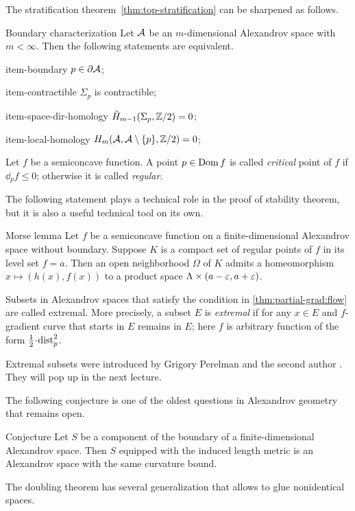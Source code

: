 The stratification theorem~\ref{thm:top-stratification} can be sharpened as follows.

\begin{thm}{Boundary characterization}
Let $\mathcal{A}$ be an $m$-dimensional Alexandrov space with $m<\infty$.
Then the following statements are equivalent.

\begin{subthm}{item-boundary} $p\in \partial \mathcal{A}$;
\end{subthm}

\begin{subthm}{item-contractible} $\Sigma_p$ is contractible;
\end{subthm}

\begin{subthm}{item-space-dir-homology} $\tilde H_{m-1}(\Sigma_p,\mathbb{Z}/2)= 0$;
\end{subthm}

\begin{subthm}{item-local-homology} $H_m(\mathcal{A},\mathcal{A}\setminus \{p\},\mathbb{Z}/2)= 0$;
\end{subthm}

\end{thm}

Let $f$ be a semiconcave function.
A point $p\in \mathop{\rm Dom}\nolimits f$ is called \emph{critical} point of $f$ if $\dd_pf\le 0$; 
otherwise it is called \emph{regular}.

The following statement plays a technical role in the proof of stability theorem,
but it is also a useful technical tool on its own.

\begin{thm}{Morse lemma}
Let $f$ be a semiconcave function on a finite-dimensional Alexandrov space without boundary.
Suppose $K$ is a compact set of regular points of $f$ in its level set $f=a$.
Then an open neighborhood $\Omega$ of $K$ admits a homeomorphism $x\mapsto (h(x),f(x))$ to a product space $\Lambda\times (a-\varepsilon,a+\varepsilon)$.
\end{thm}

Subsets in Alexandrov spaces that satisfy the condition in \ref{thm:partial-grad:flow} are called extremal.
More precisely, a subset $E$ is \emph{extremal} if for any $x\in E$
and $f$-gradient curve that starts in $E$ remains in $E$;
here $f$ is arbitrary function of the form $\tfrac12\cdot \distfun_p^2$. %

Extremal subsets were introduced by Grigory Perelman and the second author \cite{perelman-petrunin}.
They will pop up in the next lecture.

The following conjecture is one of the oldest questions in Alexandrov geometry that remains open.

\begin{thm}{Conjecture}
Let $S$ be a component of the boundary of a finite-dimensional Alexandrov space.
Then $S$ equipped with the induced length metric is an Alexandrov space with the same curvature bound.
\end{thm}

The doubling theorem has several generalization \cite{petrunin1997,ge-li} that allows to glue nonidentical spaces.
